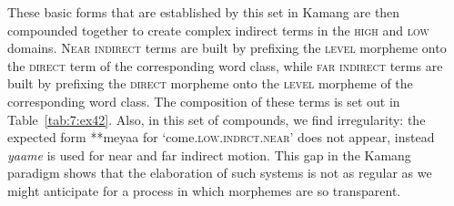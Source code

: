 These basic forms that are established by this set in Kamang are then compounded together to create complex indirect terms in the \textsc{high} and \textsc{low} domains. N\textsc{ear} \textsc{indirect} terms are built by prefixing the \textsc{level} morpheme onto the \textsc{direct} term of the corresponding word class, while \textsc{far} \textsc{indirect} terms are built by prefixing the \textsc{direct} morpheme onto the \textsc{level} morpheme of the corresponding word class. The composition of these terms is set out in Table~\ref{tab:7:ex42}. Also, in this set of compounds, we find irregularity: the expected form **meyaa{\ng} for `come.\textsc{low.indrct.near}'  does not appear, instead \textit{yaa{\ng}me} is used for near and far indirect motion. This gap in the Kamang paradigm shows that the elaboration of such systems is not as regular as we might anticipate for a process in which morphemes are so transparent. 



